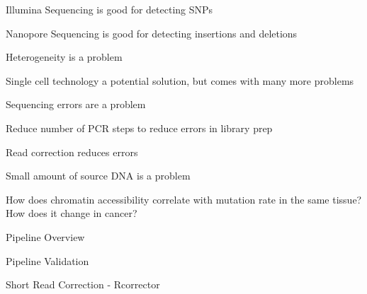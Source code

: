 \documentclass{beamer}
\begin{document}

\begin{frame}{Illumina Sequencing is good for detecting SNPs}
\end{frame}

\begin{frame}{Nanopore Sequencing is good for detecting insertions and deletions}
\end{frame}


\begin{frame}{Heterogeneity is a problem}
\end{frame}

\begin{frame}{Single cell technology a potential solution, but comes with many more problems}
\end{frame}

\begin{frame}{Sequencing errors are a problem}
\end{frame}

\begin{frame}{Reduce number of PCR steps to reduce errors in library prep}
\end{frame}

\begin{frame}{Read correction reduces errors}
\end{frame}

\begin{frame}{Small amount of source DNA is a problem}
\end{frame}


\begin{frame}{How does chromatin accessibility correlate with mutation rate in the same tissue? How does it change in cancer?}
\end{frame}


\begin{frame}{Pipeline Overview}
\end{frame}

\begin{frame}{Pipeline Validation}
\end{frame}

\begin{frame}{Short Read Correction - Rcorrector}
\end{frame}
\end{document}
